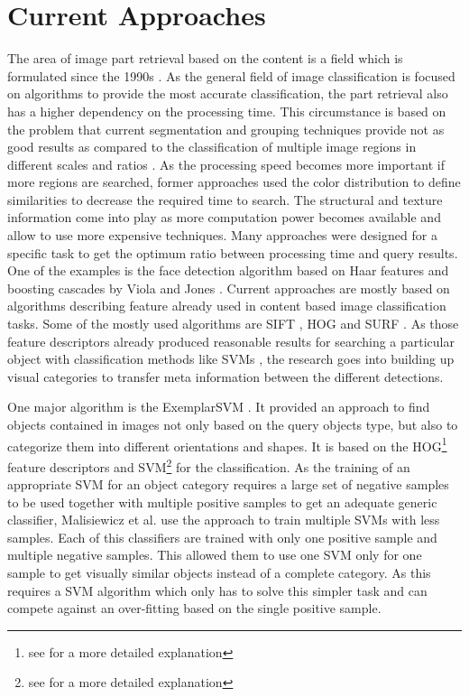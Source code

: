 \chapter{Current Approaches}

The area of image part retrieval based on the content is a field which is formulated since the 1990s \cite{eakins1999content} \cite{rui1997content} \cite{osuna1997training}. As the general field of image classification is focused on algorithms to provide the most accurate classification, the part retrieval also has a higher dependency on the processing time. This circumstance is based on the problem that current segmentation and grouping techniques provide not as good results as compared to the classification of multiple image regions in different scales and ratios \cite{book:848523}. As the processing speed becomes more important if more regions are searched, former approaches used the color distribution to define similarities to decrease the required time to search. The structural and texture information come into play as more computation power becomes available and allow to use more expensive techniques. Many approaches were designed for a specific task to get the optimum ratio between processing time and query results. One of the examples is the face detection algorithm based on Haar features and boosting cascades by Viola and Jones \cite{viola2001rapid}. Current approaches are mostly based on algorithms describing feature already used in content based image classification tasks. Some of the mostly used algorithms are \acf{SIFT} \cite{Lowe2004}, \acf{HOG} \cite{Dalal2005} and \acf{SURF} \cite{bay2008speeded}. As those feature descriptors already produced reasonable results for searching a particular object with classification methods like \aclp{SVM} \cite{cortes1995support}, the research goes into building up visual categories to transfer meta information between the different detections.

One major algorithm is the ExemplarSVM \cite{Malisiewicz2011}. It provided an approach to find objects contained in images not only based on the query objects type, but also to categorize them into different orientations and shapes.
It is based on the \ac{HOG}\footnote{see  for a more detailed explanation} feature descriptors and \ac{SVM}\footnote{see  for a more detailed explanation} for the classification. As the training of an appropriate \ac{SVM} for an object category requires a large set of negative samples to be used together with multiple positive samples to get an adequate generic classifier, Malisiewicz et al. use the approach to train multiple \acp{SVM} with less samples. Each of this classifiers are trained with only one positive sample and multiple negative samples. This allowed them to use one \ac{SVM} only for one sample to get visually similar objects instead of a complete category. As this requires a \ac{SVM} algorithm which only has to solve this simpler task and can compete against an over-fitting based on the single positive sample.

